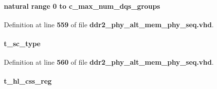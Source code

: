\paragraph[{group\+\_\+num}]{ {\bfseries \textcolor{comment}{natural}\textcolor{vhdlchar}{ }\textcolor{vhdlchar}{ }\textcolor{vhdlchar}{ }\textcolor{keywordflow}{range}\textcolor{vhdlchar}{ }\textcolor{vhdlchar}{ } \textcolor{vhdldigit}{0} \textcolor{vhdlchar}{ }\textcolor{keywordflow}{to}\textcolor{vhdlchar}{ }\textcolor{vhdlchar}{ }\textcolor{vhdlchar}{ }\textcolor{vhdlchar}{ }{\bfseries {\bf c\+\_\+max\+\_\+num\+\_\+dqs\+\_\+groups}} \textcolor{vhdlchar}{ }} \hspace{0.3cm}{\ttfamily [Record]}}\label{classddr2__phy__alt__mem__phy__record__pkg_a9fbc3b92007e9f64121f9468ac43d964}


Definition at line {\bf 559} of file {\bf ddr2\+\_\+phy\+\_\+alt\+\_\+mem\+\_\+phy\+\_\+seq.\+vhd}.

\paragraph[{group\+\_\+type}]{ {\bfseries {\bfseries {\bf t\+\_\+sc\+\_\+type}} \textcolor{vhdlchar}{ }} \hspace{0.3cm}{\ttfamily [Record]}}\label{classddr2__phy__alt__mem__phy__record__pkg_a89b2006b0347d0c4d9c6b80c1326fdf6}


Definition at line {\bf 560} of file {\bf ddr2\+\_\+phy\+\_\+alt\+\_\+mem\+\_\+phy\+\_\+seq.\+vhd}.

\paragraph[{hl\+\_\+css}]{ {\bfseries {\bfseries {\bf t\+\_\+hl\+\_\+css\+\_\+reg}} \textcolor{vhdlchar}{ }} \hspace{0.3cm}{\ttfamily [Record]}}\label{classddr2__phy__alt__mem__phy__record__pkg_af34b59759a5c982e29bf64a04536d685}


